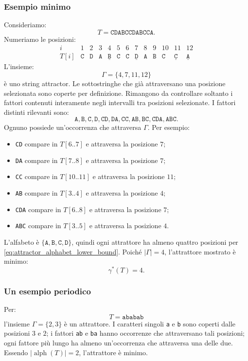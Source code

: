 \documentclass{article}
\theoremstyle{definition}
\numberwithin{equation}{section}
\begin{document}
\subsubsection{Esempio minimo}
Consideriamo:
\[
    T=\texttt{CDABCCDABCCA}.
\]
Numeriamo le posizioni:
\[
    \begin{array}{c|cccccccccccc}
        i                      & 1          & 2          & 3          & 4 & 5 & 6 & 7 & 8 & 9 & 10 & 11 & 12 \\ \hline
        T[i]                   & \texttt{C} & \texttt{D} & \texttt{A} &
        \underline{\texttt{B}} &
        \texttt{C}             & \texttt{C} &
        \underline{\texttt{D}} &
        \texttt{A}             & \texttt{B} & \texttt{C} &
        \underline{\texttt{C}} &
        \underline{\texttt{A}}
    \end{array}
\]
L'insieme:
\[
    \Gamma=\{4,7,11,12\}
\]
è uno string attractor. Le sottostringhe che già attraversano una posizione
selezionata sono coperte per definizione. Rimangono da controllare soltanto i
fattori contenuti interamente negli intervalli tra posizioni selezionate. I
fattori distinti rilevanti sono:
\[
    \texttt{A},\texttt{B},\texttt{C},\texttt{D},
    \texttt{CD},\texttt{DA},\texttt{CC},\texttt{AB},\texttt{BC},
    \texttt{CDA},\texttt{ABC}.
\]
Ognuno possiede un'occorrenza che attraversa $\Gamma$. Per esempio:
\begin{itemize}
    \item \texttt{CD} compare in $T[6..7]$ e attraversa la posizione $7$;
    \item \texttt{DA} compare in $T[7..8]$ e attraversa la posizione $7$;
    \item \texttt{CC} compare in $T[10..11]$ e attraversa la posizione $11$;
    \item \texttt{AB} compare in $T[3..4]$ e attraversa la posizione $4$;
    \item \texttt{CDA} compare in $T[6..8]$ e attraversa la posizione $7$;
    \item \texttt{ABC} compare in $T[3..5]$ e attraversa la posizione $4$.
\end{itemize}

L'alfabeto è $\{\texttt{A},\texttt{B},\texttt{C},\texttt{D}\}$, quindi ogni
attrattore ha almeno quattro posizioni per
\eqref{eq:attractor_alphabet_lower_bound}. Poiché $|\Gamma|=4$, l'attrattore
mostrato è minimo:
\[
    \gamma^*(T)=4.
\]

\subsubsection{Un esempio periodico}
Per:
\[
    T=\texttt{ababab}
\]
l'insieme $\Gamma=\{2,3\}$ è un attrattore. I caratteri singoli
\texttt{a} e \texttt{b} sono coperti dalle posizioni $3$ e $2$; i fattori
\texttt{ab} e \texttt{ba} hanno occorrenze che attraversano tali posizioni;
ogni fattore più lungo ha almeno un'occorrenza che attraversa una delle due.
Essendo
$|\operatorname{alph}(T)|=2$, l'attrattore è minimo.
\end{document}
